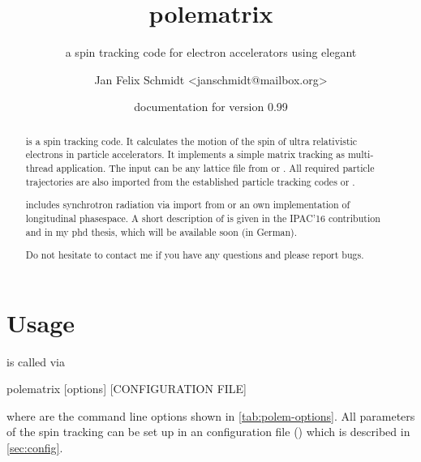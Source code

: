 \documentclass[a4paper]{scrartcl}
\author{Jan Felix Schmidt \textless janschmidt@mailbox.org\textgreater}
\title{polematrix}
\subtitle{a spin tracking code for electron accelerators using elegant}
\date{documentation for version 0.99}
\begin{document}
\maketitle

\begin{abstract}
  \polem is a spin tracking code. It calculates the motion of the spin of ultra
  relativistic electrons in particle accelerators. It implements a simple matrix tracking
  as multi-thread \cpp application. The input can be any lattice file from \ele or
  \madx. All required particle trajectories are also imported from the established
  particle tracking codes \ele or \madx.

  \polem includes synchrotron radiation via import from \ele or an own implementation of
  longitudinal phasespace. A short description of \polem is given in the IPAC'16
  contribution \cite{IPAC16-decoh} and in my phd thesis, which will be available soon (in
  German).
  
  Do not hesitate to contact me if you have any questions and please report bugs.
\end{abstract}

\tableofcontents
\clearpage



\section{Usage}
\label{sec:usage}

\polem is called via
\begin{bashcode}
  polematrix [options] [CONFIGURATION FILE]
\end{bashcode}
where \bashinline{[options]} are the command line options shown in
\cref{tab:polem-options}. All parameters of the spin tracking can be set up in an \xml
configuration file () which is described in
\cref{sec:config}.
\end{document}
